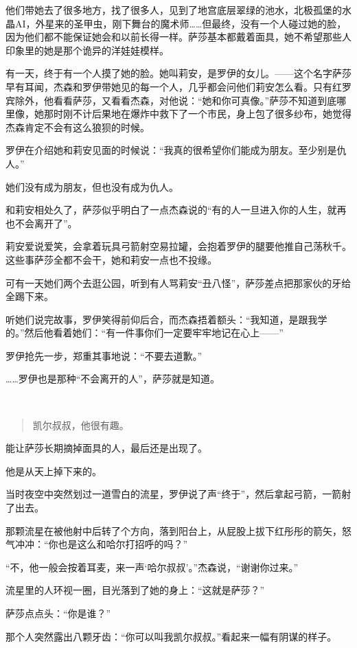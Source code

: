 \documentclass[../main]{subfiles}
\begin{document}
他们带她去了很多地方，找了很多人，见到了地宫底层翠绿的池水，北极孤堡的水晶AI，外星来的圣甲虫，刚下舞台的魔术师……但最终，没有一个人碰过她的脸，因为他们都不能保证她会和以前长得一样。萨莎基本都戴着面具，她不希望那些人印象里的她是那个诡异的洋娃娃模样。

有一天，终于有一个人摸了她的脸。她叫莉安，是罗伊的女儿。——这个名字萨莎早有耳闻，杰森和罗伊带她见的每一个人，几乎都会问他们莉安怎么看。只有红罗宾除外，他看看萨莎，又看看杰森，对他说：“她和你可真像。”萨莎不知道到底哪里像，她那时刚不计后果地在爆炸中救下了一个市民，身上包了很多纱布，她觉得杰森肯定不会有这么狼狈的时候。

罗伊在介绍她和莉安见面的时候说：“我真的很希望你们能成为朋友。至少别是仇人。”

她们没有成为朋友，但也没有成为仇人。

和莉安相处久了，萨莎似乎明白了一点杰森说的“有的人一旦进入你的人生，就再也不会离开了”。

莉安爱说爱笑，会拿着玩具弓箭射空易拉罐，会抱着罗伊的腿要他推自己荡秋千。这些事萨莎全都不会干，她和莉安一点也不投缘。

可有一天她们两个去逛公园，听到有人骂莉安“丑八怪”，萨莎差点把那家伙的牙给全踢下来。

听她们说完故事，罗伊笑得前仰后合，而杰森捂着额头：“我知道，是跟我学的。”然后他看着她们：“有一件事你们一定要牢牢地记在心上——”

罗伊抢先一步，郑重其事地说：“不要去道歉。”

……罗伊也是那种“不会离开的人”，萨莎就是知道。

~\

\begin{quote}
    凯尔叔叔，他很有趣。
\end{quote}

能让萨莎长期摘掉面具的人，最后还是出现了。

他是从天上掉下来的。

当时夜空中突然划过一道雪白的流星，罗伊说了声“终于”，然后拿起弓箭，一箭射了出去。

那颗流星在被他射中后转了个方向，落到阳台上，从屁股上拔下红彤彤的箭矢，怒气冲冲：“你也是这么和哈尔打招呼的吗？”

“不，他一般会按着耳麦，来一声‘哈尔叔叔’。”杰森说，“谢谢你过来。”

流星里的人环视一圈，目光落到了她的身上：“这就是萨莎？”

萨莎点点头：“你是谁？”

那个人突然露出八颗牙齿：“你可以叫我凯尔叔叔。”看起来一幅有阴谋的样子。
\end{document}
